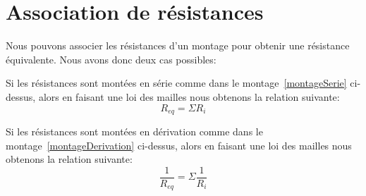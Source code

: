\documentclass[11pt,a4paper,openany]{book}
\begin{document}
\section{Association de résistances}

Nous pouvons associer les résistances d'un montage pour obtenir une résistance équivalente. Nous avons donc deux cas possibles:
\begin{figure}[!h]
\begin{center}
\hfill
{}
\end{center}
\caption{}
\end{figure}


Si les résistances sont montées en série comme dans le montage~\ref{montageSerie} ci-dessus, alors en faisant une loi des mailles nous obtenons la relation suivante:
\begin{equation}
R_{eq} = \Sigma R_{i}
\end{equation}

Si les résistances sont montées en dérivation comme dans le montage~\ref{montageDerivation} ci-dessus, alors en faisant une loi des mailles nous obtenons la relation suivante:
\begin{equation}
\frac{1}{R_{eq}} = \Sigma\frac{1}{R_{i}}
\end{equation}
\end{document}
